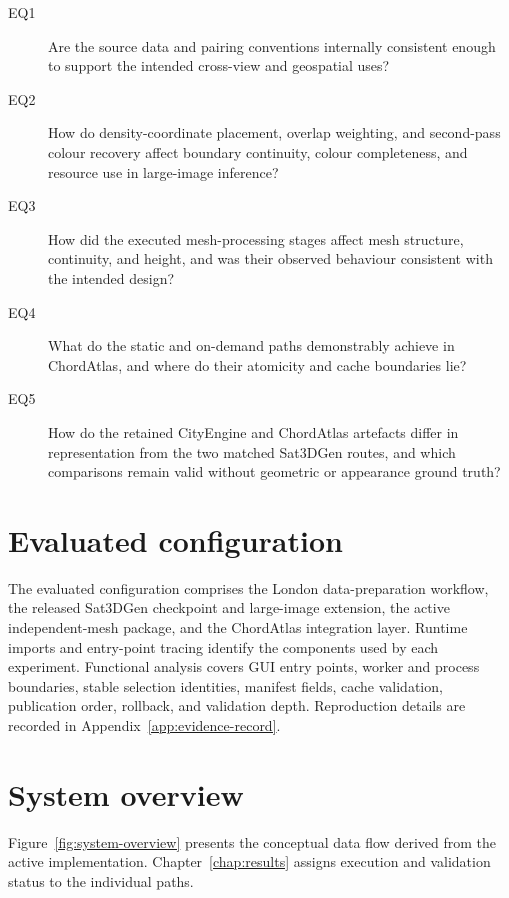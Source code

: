 \begin{description}
  \item[EQ1] Are the source data and pairing conventions internally consistent
  enough to support the intended cross-view and geospatial uses?
  \item[EQ2] How do density-coordinate placement, overlap weighting, and
  second-pass colour recovery affect boundary continuity, colour completeness,
  and resource use in large-image inference?
  \item[EQ3] How did the executed mesh-processing stages affect mesh structure, continuity, and height, and was their observed behaviour consistent with the intended design?
  \item[EQ4] What do the static and on-demand paths demonstrably achieve in
  ChordAtlas, and where do their atomicity and cache boundaries lie?
  \item[EQ5] How do the retained CityEngine and ChordAtlas artefacts differ in
  representation from the two matched Sat3DGen routes, and which comparisons
  remain valid without geometric or appearance ground truth?
\end{description}

\section{Evaluated configuration}

The evaluated configuration comprises the London data-preparation workflow,
the released Sat3DGen checkpoint and large-image extension, the active
independent-mesh package, and the ChordAtlas integration layer.  Runtime imports
and entry-point tracing identify the components used by each experiment.
Functional analysis covers GUI entry points, worker and process boundaries,
stable selection identities, manifest fields, cache validation, publication
order, rollback, and validation depth.  Reproduction details are recorded in
Appendix~\ref{app:evidence-record}.

\section{System overview}

Figure~\ref{fig:system-overview} presents the conceptual data flow derived from
the active implementation.  Chapter~\ref{chap:results} assigns execution and
validation status to the individual paths.

